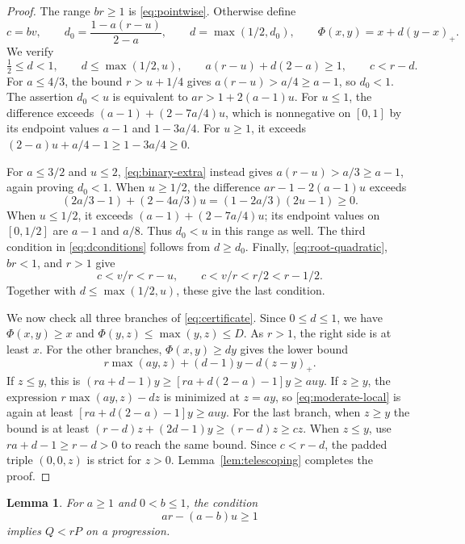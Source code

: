 \documentclass[11pt,a4paper]{article}
\newtheorem{lemma}[theorem]{Lemma}
\theoremstyle{remark}
\newcommand{\pos}[1]{\left(#1\right)_+}
\begin{document}
\begin{proof}
The range $br\ge1$ is \eqref{eq:pointwise}. Otherwise define
\[
 c=bv,\qquad d_0=\frac{1-a(r-u)}{2-a},\qquad
 d=\max(1/2,d_0),\qquad\Phi(x,y)=x+d\pos{y-x}.
\]
We verify
\begin{equation}\label{eq:dconditions}
 \tfrac12\le d<1,\qquad d\le\max(1/2,u),\qquad
 a(r-u)+d(2-a)\ge1,
 \qquad c<r-d.
\end{equation}
For $a\le4/3$, the bound $r>u+1/4$ gives
$a(r-u)>a/4\ge a-1$, so $d_0<1$.
The assertion $d_0<u$ is equivalent to $ar>1+2(a-1)u$.
For $u\le1$, the difference exceeds
$(a-1)+(2-7a/4)u$, which is nonnegative on $[0,1]$ by its
endpoint values $a-1$ and $1-3a/4$.
For $u\ge1$, it exceeds $(2-a)u+a/4-1\ge1-3a/4\ge0$.

For $a\le3/2$ and $u\le2$, \eqref{eq:binary-extra} instead gives
$a(r-u)>a/3\ge a-1$, again proving $d_0<1$.
When $u\ge1/2$, the difference $ar-1-2(a-1)u$ exceeds
\[
 (2a/3-1)+(2-4a/3)u=(1-2a/3)(2u-1)\ge0.
\]
When $u\le1/2$, it exceeds $(a-1)+(2-7a/4)u$;
its endpoint values on $[0,1/2]$ are $a-1$ and $a/8$.
Thus $d_0<u$ in this range as well.
The third condition in \eqref{eq:dconditions} follows from $d\ge d_0$.
Finally, \eqref{eq:root-quadratic}, $br<1$, and $r>1$ give
\[
 c<v/r<r-u,\qquad c<v/r<r/2<r-1/2.
\]
Together with $d\le\max(1/2,u)$, these give the last condition.

We now check all three branches of \eqref{eq:certificate}.
Since $0\le d\le1$, we have $\Phi(x,y)\ge x$ and
$\Phi(y,z)\le\max(y,z)\le D$. As $r>1$, the right side is at least
$x$. For the other branches, $\Phi(x,y)\ge dy$ gives the lower bound
\begin{equation}\label{eq:moderate-local}
 r\max(ay,z)+(d-1)y-d\pos{z-y}.
\end{equation}
If $z\le y$, this is $(ra+d-1)y\ge[ra+d(2-a)-1]y\ge auy$.
If $z\ge y$, the expression $r\max(ay,z)-dz$ is minimized at
$z=ay$, so \eqref{eq:moderate-local} is again at least
$[ra+d(2-a)-1]y\ge auy$.
For the last branch, when $z\ge y$ the bound is at least
$(r-d)z+(2d-1)y\ge(r-d)z\ge cz$.
When $z\le y$, use $ra+d-1\ge r-d>0$ to reach the same bound.
Since $c<r-d$, the padded triple $(0,0,z)$ is strict for $z>0$.
Lemma~\ref{lem:telescoping} completes the proof.
\end{proof}

\begin{lemma}\label{lem:linear-middle}
For $a\ge1$ and $0<b\le1$, the condition
\begin{equation}\label{eq:linear-middle-condition}
 ar-(a-b)u\ge1
\end{equation}
implies $Q<rP$ on a progression.
\end{lemma}
\end{document}
